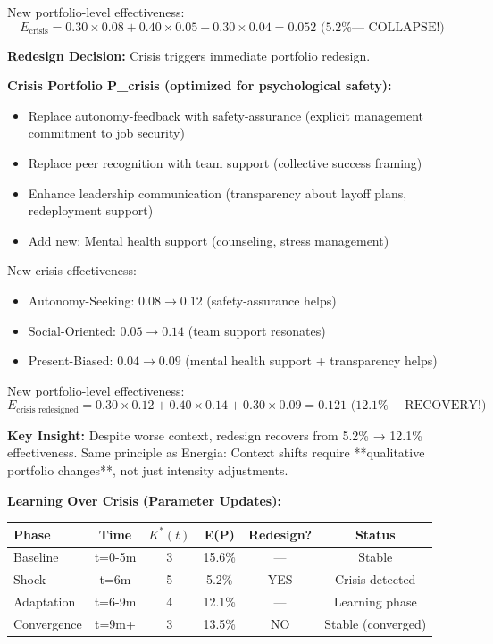 New portfolio-level effectiveness:
\begin{equation}
E_{\text{crisis}} = 0.30 \times 0.08 + 0.40 \times 0.05 + 0.30 \times 0.04 = 0.052 \text{ (5.2\% — COLLAPSE!)}
\end{equation}

\textbf{Redesign Decision:} Crisis triggers immediate portfolio redesign.

\textbf{Crisis Portfolio P_crisis (optimized for psychological safety):}
\begin{itemize}[nosep]
\item Replace autonomy-feedback with safety-assurance (explicit management commitment to job security)
\item Replace peer recognition with team support (collective success framing)
\item Enhance leadership communication (transparency about layoff plans, redeployment support)
\item Add new: Mental health support (counseling, stress management)
\end{itemize}

New crisis effectiveness:
\begin{itemize}[nosep]
\item Autonomy-Seeking: $0.08 \to 0.12$ (safety-assurance helps)
\item Social-Oriented: $0.05 \to 0.14$ (team support resonates)
\item Present-Biased: $0.04 \to 0.09$ (mental health support + transparency helps)
\end{itemize}

New portfolio-level effectiveness:
\begin{equation}
E_{\text{crisis redesigned}} = 0.30 \times 0.12 + 0.40 \times 0.14 + 0.30 \times 0.09 = 0.121 \text{ (12.1\% — RECOVERY!)}
\end{equation}

\textbf{Key Insight:} Despite worse context, redesign recovers from 5.2\% → 12.1\% effectiveness. Same principle as Energia: Context shifts require **qualitative portfolio changes**, not just intensity adjustments.

\textbf{Learning Over Crisis (Parameter Updates):}

\begin{center}
\begin{tabular}{lccccc}
\toprule
\textbf{Phase} & \textbf{Time} & $K^*(t)$ & \textbf{E(P)} & \textbf{Redesign?} & \textbf{Status} \\
\midrule
Baseline & t=0-5m & 3 & 15.6\% & — & Stable \\
Shock & t=6m & 5 & 5.2\% & YES & Crisis detected \\
Adaptation & t=6-9m & 4 & 12.1\% & — & Learning phase \\
Convergence & t=9m+ & 3 & 13.5\% & NO & Stable (converged) \\
\bottomrule
\end{tabular}
\end{center}

